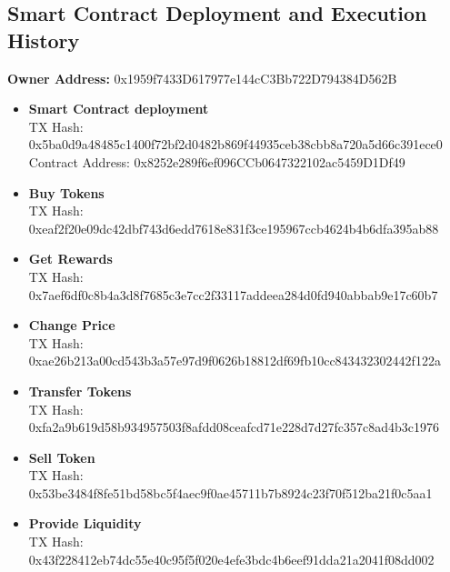 \documentclass[12pt,a4paper]{article}
\begin{document}
\subsection*{Smart Contract Deployment and Execution History}

\textbf{Owner Address:} 0x1959f7433D617977e144cC3Bb722D794384D562B

\begin{itemize}
    \item \textbf{Smart Contract deployment}\\
    TX Hash: 0x5ba0d9a48485c1400f72bf2d0482b869f44935ceb38cbb8a720a5d66c391ece0 \\
    Contract Address: 0x8252e289f6ef096CCb0647322102ac5459D1Df49
    \item \textbf{Buy Tokens}\\
    TX Hash: 0xeaf2f20e09dc42dbf743d6edd7618e831f3ce195967ccb4624b4b6dfa395ab88
    \item \textbf{Get Rewards}\\
    TX Hash: 0x7aef6df0c8b4a3d8f7685c3e7cc2f33117addeea284d0fd940abbab9e17c60b7
    \item \textbf{Change Price}\\
    TX Hash: 0xae26b213a00cd543b3a57e97d9f0626b18812df69fb10cc843432302442f122a
    \item \textbf{Transfer Tokens}\\
    TX Hash: 0xfa2a9b619d58b934957503f8afdd08ceafcd71e228d7d27fc357c8ad4b3c1976
    \item \textbf{Sell Token}\\
    TX Hash: 0x53be3484f8fe51bd58bc5f4aec9f0ae45711b7b8924c23f70f512ba21f0c5aa1
    \item \textbf{Provide Liquidity}\\
    TX Hash: 0x43f228412eb74dc55e40c95f5f020e4efe3bdc4b6eef91dda21a2041f08dd002
\end{itemize}
\end{document}
